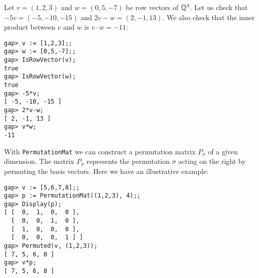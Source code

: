 \begin{example}
Let $v=(1,2,3)$ and $w=(0,5,-7)$ be row vectors of $\mathbb{Q}^3$. 
Let us check that $-5v=(-5,-10,-15)$ and $2v-w=(2,-1,13)$. We also check that the inner product between $v$ and $w$ is $v\cdot w=-11$: 
\begin{lstlisting}
gap> v := [1,2,3];;
gap> w := [0,5,-7];;
gap> IsRowVector(v);
true
gap> IsRowVector(w);
true
gap> -5*v;
[ -5, -10, -15 ]
gap> 2*v-w;
[ 2, -1, 13 ]
gap> v*w;
-11
\end{lstlisting}
\end{example}

\begin{example}
    With \lstinline{PermutationMat} we can construct a permutation matrix 
    $P_{\sigma}$ 
    of a given dimension. The matrix  
    $P_{\sigma}$ represents the permutation $\sigma$ acting on the right
    by permuting the basis vectors. Here we have 
    an illustrative example:
\begin{lstlisting}
gap> v := [5,6,7,8];;
gap> p := PermutationMat((1,2,3), 4);;
gap> Display(p);
[ [  0,  1,  0,  0 ],
  [  0,  0,  1,  0 ],
  [  1,  0,  0,  0 ],
  [  0,  0,  0,  1 ] ]
gap> Permuted(v, (1,2,3));
[ 7, 5, 6, 8 ]
gap> v*p;
[ 7, 5, 6, 8 ]    
\end{lstlisting}  
\end{example}

